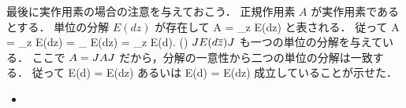 最後に実作用素の場合の注意を与えておこう．
正規作用素 $A$ が実作用素であるとする．
単位の分解 $E(dz)$ が存在して
\bdm %
A
= \int_\C z E(dz)
\edm %
と表される．
従って
\bdm %
\J A \J
= \J \int_\C z E(dz) \J
=  \int_\C {} \J E(dz)\J
=  \int_\C z \J E(d)\J. \quad (\because {})
\edm %
$J E(d\overline{z})J$ も一つの単位の分解を与えている．
ここで $A=J A J$ だから，分解の一意性から二つの単位の分解は一致する．
従って
\bdn %
\J E(d)\J
=  E(dz)
\edn %
あるいは
\bdn %
E(d)
= \J  E(dz)\J
{}
\edn %
成立していることが示せた．



\begin{itemize}
\item
\end{itemize}


